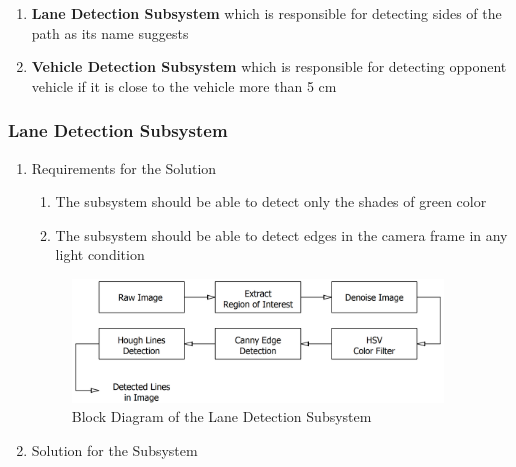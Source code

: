 \documentclass[a4paper,12pt]{article}
\begin{document}
			\begin{enumerate}
				\item \textbf{Lane Detection Subsystem} which is responsible for detecting sides of the path as its name suggests
				\item \textbf{Vehicle Detection Subsystem} which is responsible for detecting opponent vehicle if it is close to the vehicle more than 5 cm
			\end{enumerate}
	
	
		\subsubsection{Lane Detection Subsystem}\label{sec:LaneDetectionSubsystem}

			\begin{enumerate}
			\item {Requirements for the Solution}

				
		
		
			
			\begin{enumerate}
				\item The subsystem should be able to detect only the shades of green color
				\item The subsystem should be able to detect edges in the camera frame in any light condition

			\end{enumerate}
			
		
			
			\begin{figure}[h]
			\includegraphics[width=0.93\textwidth,center]{images/vModels/laneDetection_subsystem}
			\caption{Block Diagram of the Lane Detection Subsystem}\label{fig:lane_detection_subsystem}
		\end{figure}
		
			
			
			\item {Solution for the Subsystem}
			

\end{enumerate}
\end{document}

